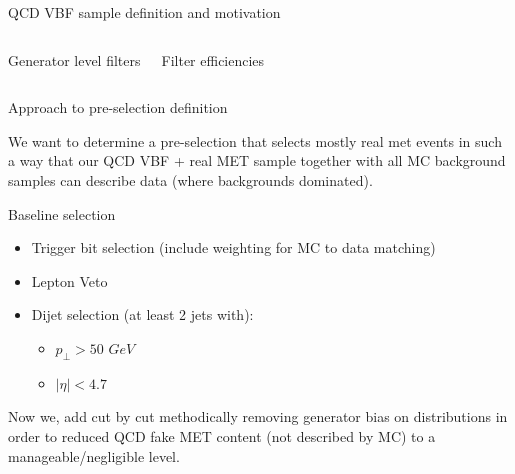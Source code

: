 \documentclass[8pt]{beamer}
\begin{document}
\begin{frame}{QCD VBF sample definition and motivation}
\begin{columns}
\begin{block}{Generator level filters}
\end{block}

\begin{block}{Filter efficiencies}
 

\end{block}

\end{columns}

\end{frame}

\begin{frame}{Approach to pre-selection definition}

We want to determine a pre-selection that selects mostly real met events in such a way that our QCD VBF + real MET sample together with all MC background samples can describe data (where backgrounds dominated).   

\begin{block}{Baseline selection}
 
\begin{itemize}
  \item Trigger bit selection (include weighting for MC to data matching)
  \item Lepton Veto
  \item Dijet selection (at least 2 jets with):
  \begin{itemize}
    \item $p_{\perp}>50$ $GeV$ 
    \item $|\eta|<4.7$
  \end{itemize}
\end{itemize}

\end{block}

Now we, add cut by cut methodically removing generator bias on distributions in order to reduced QCD fake MET content (not described by MC) to a manageable/negligible level.    

\end{frame}
\end{document}
